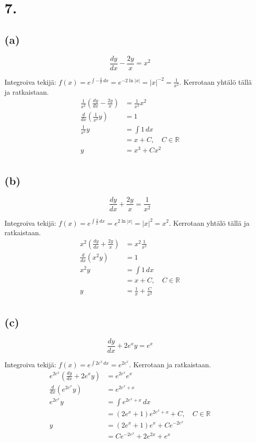 \documentclass{article}
\begin{document}
\section*{7.}

\subsection*{(a)}

\[
  \frac{dy}{dx} - \frac{2y}{x} = x^2
\]

Integroiva tekijä: $f(x) = e^{\int -\frac{2}{x} \,dx} = e^{-2 \ln |x|}
= |x|^{-2} = \frac{1}{x^2}$.
Kerrotaan yhtälö tällä ja ratkaistaan.
\begin{align*}
  \frac{1}{x^2} (\frac{dy}{dx} - \frac{2y}{x}) &= \frac{1}{x^2}x^2 \\
  \frac{d}{dx}(\frac{1}{x^2}y) &= 1 \\
  \frac{1}{x^2}y &= \int 1 \,dx \\
                 &= x + C, \quad C \in \mathbb{R} \\
  y &= x^3 + Cx^2 \\
\end{align*}

\subsection*{(b)}

\[
  \frac{dy}{dx} + \frac{2y}{x} = \frac{1}{x^2}
\]

Integroiva tekijä: $f(x) = e^{\int \frac{2}{x}\,dx} = e^{2 \ln |x|}
= |x|^2 = x^2$.
Kerrotaan yhtälö tällä ja ratkaistaan.
\begin{align*}
  x^2(\frac{dy}{dx} + \frac{2y}{x}) &= x^2\frac{1}{x^2} \\
  \frac{d}{dx}(x^2y) &= 1 \\
  x^2y &= \int 1\,dx \\
       &= x + C, \quad C \in \mathbb{R} \\
  y &= \frac{1}{x} + \frac{C}{x^2} \\
\end{align*}

\subsection*{(c)}

\[
  \frac{dy}{dx} + 2e^xy = e^x
\]

Integroiva tekijä: $f(x) = e^{\int 2e^x\,dx} = e^{2e^x}$.
Kerrotaan ja ratkaistaan.
\begin{align*}
  e^{2e^x}(\frac{dy}{dx} + 2e^xy) &= e^{2e^x}e^x \\
  \frac{d}{dx}(e^{2e^x}y) &= e^{2e^x + x} \\
  e^{2e^x}y &= \int e^{2e^x + x}\,dx \\
            &= (2e^x + 1)e^{2e^x + x} + C, \quad C \in \mathbb{R} \\
  y &= (2e^x + 1)e^x + Ce^{-2e^x} \\
    &= Ce^{-2e^x} + 2e^{2x} + e^x \\
\end{align*}
\end{document}
